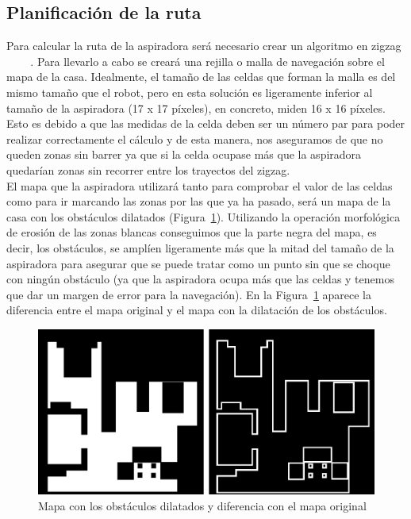 \subsection{Planificación de la ruta}

Para calcular la ruta de la aspiradora será necesario crear un algoritmo en zigzag ~\cite{algorithm} ~\cite{algorithm1} ~\cite{algorithm2}. Para llevarlo a cabo se creará una rejilla o malla de navegación sobre el mapa de la casa. Idealmente, el tamaño de las celdas que forman la malla es del mismo tamaño que el robot, pero en esta solución es ligeramente inferior al tamaño de la aspiradora (17 x 17 píxeles), en concreto, miden 16 x 16 píxeles. Esto es debido a que las medidas de la celda deben ser un número par para poder realizar correctamente el cálculo y de esta manera, nos aseguramos de que no queden zonas sin barrer ya que si la celda ocupase más que la aspiradora quedarían zonas sin recorrer entre los trayectos del zigzag. \\

El mapa que la aspiradora utilizará tanto para comprobar el valor de las celdas como para ir marcando las zonas por las que ya ha pasado, será un mapa de la casa con los obstáculos dilatados (Figura~\ref{fig.obsDil}). Utilizando la operación morfológica de erosión de las zonas blancas conseguimos que la parte negra del mapa, es decir, los obstáculos, se amplíen ligeramente más que la mitad del tamaño de la aspiradora para asegurar que se puede tratar como un punto sin que se choque con ningún obstáculo (ya que la aspiradora ocupa más que las celdas y tenemos que dar un margen de error para la navegación). En la Figura~\ref{fig.obsDil} aparece la diferencia entre el mapa original y el mapa con la dilatación de los obstáculos. 

\begin{figure}[H]
  \begin{center}
    \includegraphics[width=1.0\textwidth]{figures/Vacuum/2mapas.jpg}
		\caption{Mapa con los obstáculos dilatados y diferencia con el mapa original}
		\label{fig.obsDil}
		\end{center}
\end{figure}


